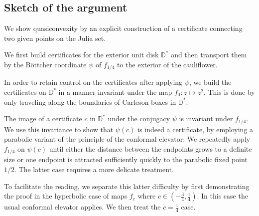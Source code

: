 \begin{comment}
Thus, for any $c$ in 

For values $c$ in quadratic polynomials $f_{c}(z)=z^{2}+c$
\end{comment}
\begin{comment}
If $f_{c}$ has an attracting fixed point then its Julia set $\mathcal{J}(f_{c})$
is a quasicircle, hence its interior and exterior are both quasiconvex.
This is the case for values of $c$ in the main cardioid of the Mandelbrot
set.
, i.e.\ for 
\[
c\in\left\{ -\frac{\lambda}{2}-\frac{\lambda^{2}}{4}:\,\left|\lambda\right|<1\right\} .
\]
\end{comment}

\subsection{Sketch of the argument}

We show quasiconvexity by an explicit construction of a certificate connecting two given points on the Julia set.

We first build certificates for the exterior unit disk $\mathbb D ^*$ and then transport them by the Böttcher coordinate $\psi$ of $f_{1/4}$ to the exterior of the cauliflower.

In order to retain control on the certificates after applying $\psi$, we build the certificates on $\mathbb D^*$ in a manner invariant under the map $f_0: z\mapsto z^2$. This is done by only traveling along the boundaries of Carleson boxes in $\mathbb D^{*}$. 

The image of a certificate $c$ in $\mathbb D^{*}$ under the conjugacy $\psi$ is invariant under $f_{1/4}$. We use this invariance to show that $\psi(c)$ is indeed a certificate, by employing a parabolic variant of the principle of the conformal elevator: We repeatedly apply $f_{1/4}$ on $\psi(c)$ until either the distance between the endpoints grows to a definite size or one endpoint is attracted sufficiently quickly to the parabolic fixed point $1/2$. The latter case requires a more delicate treatment.

To facilitate the reading, we separate this latter difficulty by first demonstrating the proof in the hyperbolic case of maps $f_c$ where  $c\in\left(-\frac 34,\frac{1}{4}\right)$. In this case the usual conformal elevator applies. We then treat the $c=\frac 14$ case.



